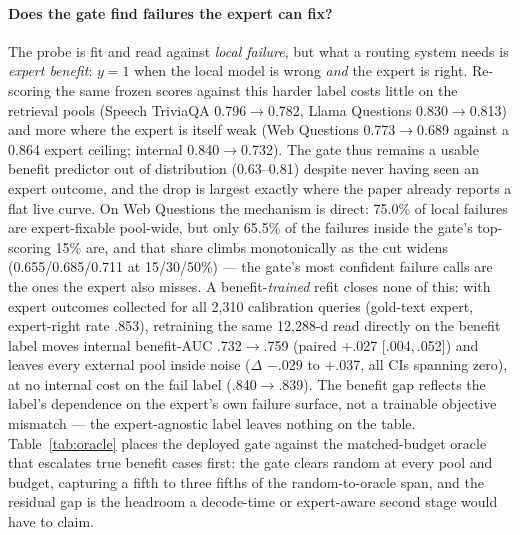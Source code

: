 \paragraph{Does the gate find failures the expert can fix?}
The probe is fit and read against \emph{local failure}, but what a
routing system needs is \emph{expert benefit}: $y{=}1$ when the local
model is wrong \emph{and} the expert is right. Re-scoring the same
frozen scores against this harder label costs little on the retrieval
pools (Speech TriviaQA 0.796$\to$0.782, Llama Questions 0.830$\to$0.813)
and more where the expert is itself weak (Web Questions
0.773$\to$0.689 against a 0.864 expert ceiling; internal 0.840$\to$0.732).
The gate thus remains a usable benefit predictor out of distribution
(0.63--0.81) despite never having seen an expert outcome, and the drop
is largest exactly where the paper already reports a flat live curve.
On Web Questions the mechanism is direct: 75.0\% of local failures are
expert-fixable pool-wide, but only 65.5\% of the failures inside the
gate's top-scoring 15\% are, and that share climbs monotonically as
the cut widens (0.655/0.685/0.711 at 15/30/50\%) --- the gate's most
confident failure calls are the ones the expert also misses.
A benefit-\emph{trained} refit closes none of this: with expert
outcomes collected for all 2{,}310 calibration queries (gold-text
expert, expert-right rate .853), retraining the same 12{,}288-d read
directly on the benefit label moves internal benefit-AUC
.732$\to$.759 (paired $+$.027 [.004,\,.052]) and leaves every
external pool inside noise ($\Delta$ $-$.029 to $+$.037, all CIs
spanning zero), at no internal cost on the fail label
(.840$\to$.839). The benefit gap reflects the label's dependence on
the expert's own failure surface, not a trainable objective
mismatch --- the expert-agnostic label leaves nothing on the table.
Table~\ref{tab:oracle} places the
deployed gate against the matched-budget oracle that escalates true
benefit cases first: the gate clears random at every pool and budget,
capturing a fifth to three fifths of the random-to-oracle span, and
the residual gap is the headroom a decode-time or expert-aware second
stage would have to claim.

